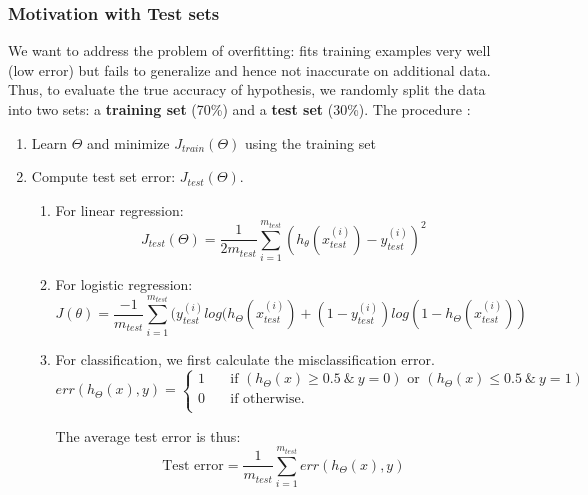     \subsubsection{Motivation with Test sets}
    We want to address the problem of overfitting: fits training examples very well (low error) but fails to generalize and hence not inaccurate on additional data. Thus, to evaluate the true accuracy of hypothesis, we randomly split the data into two sets: a \textbf{training set} (70\%) and a \textbf{test set} (30\%). 
    The procedure :
    \begin{enumerate}
        \item Learn $\Theta$ and minimize $J_{train} (\Theta)$ using the training set
        \item Compute test set error: $J_{test} (\Theta)$. 
            \begin{enumerate}
                \item For linear regression: 
                    \[
                    J_{test} (\Theta) =  \frac{1}{2m_{test}} \sum_{i=1}^{m_{test}} (h_\theta(x_{test}^{(i)}) - y_{test}^{(i)} )^2
                    \]
                \item For logistic regression:
                    \[
                        J (\theta) = \frac{-1}{m_{test}} \sum_{i=1}^{m_{test}} (y^{(i)}_{test} log(h_{\Theta} ( x^{(i)}_{test}) + (1-y^{(i)}_{test}) log(1-h_{\Theta} ( x^{(i)}_{test}) )
                    \] 
                \item For classification, we first calculate the misclassification error. 
                    \begin{equation}
                        err (h_{\Theta} (x), y) = 
                        \begin{cases}
                            1 &\quad \text{if } (h_\Theta (x) \geq 0.5 \: \& \: y=0)\text{ or } (h_\Theta (x) \leq 0.5 \:\&\:  y=1) \\
                            0 &\quad \text{if otherwise. }  \\
                        \end{cases}
                        \label{eq:misclassification-error}
                    \end{equation}

                    The average test error is thus:
                    \begin{equation}
                        \text{Test error} = \frac{1}{m_{test}} \sum_{i=1}^{m_{test}} err (h_{\Theta} (x), y)
                        \label{eq:classification-test-error}
                    \end{equation}

            \end{enumerate}
    \end{enumerate}



